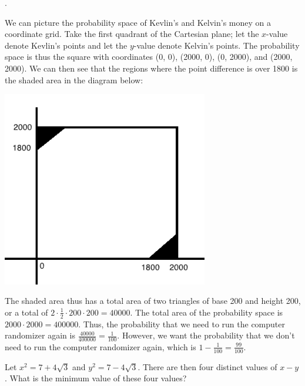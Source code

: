 \documentclass[11pt]{article}
\begin{document}
\begin{answer}
.
\end{answer}

\begin{solution}
We can picture the probability space of Kevlin's and Kelvin's money on a coordinate grid. Take the first quadrant of the Cartesian plane; let the $x$-value denote Kevlin's points and let the $y$-value denote Kelvin's points. The probability space is thus the square with coordinates (0, 0), (2000, 0), (0, 2000), and (2000, 2000). We can then see that the regions where the point difference is over 1800 is the shaded area in the diagram below:

\begin{center}
\includegraphics[width=9cm]{probspace.png}
\end{center}

The shaded area thus has a total area of two triangles of base 200 and height 200, or a total of $2\cdot\frac{1}{2}\cdot200\cdot200 = 40000$. The total area of the probability space is $2000\cdot2000=400000$. Thus, the probability that we need to run the computer randomizer again is $\frac{40000}{400000} = \frac{1}{100}$. However, we want the probability that we don't need to run the computer randomizer again, which is $1 - \frac{1}{100} = \boxed{\frac{99}{100}}$.
\end{solution}

\begin{problem}
Let $x^2 = 7 + 4\sqrt{3}$ and $y^2 = 7 - 4\sqrt{3}$. There are then four distinct values of $x-y$. What is the minimum value of these four values?
\end{problem}
\end{document}

